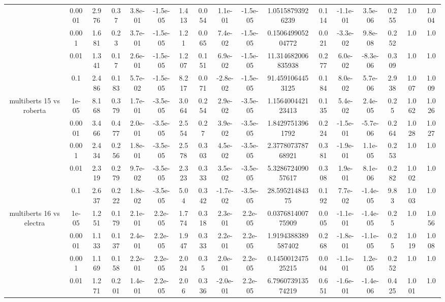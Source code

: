 \begin{tabular}{|c|c|c|c|c|c|c|c|c|c|c|c|c|c|c|c|c|}
 & 0.0001 & 2.976 & 0.37 & 3.8e-01 & -1.5e-05 & 1.413 & 0.054 & 1.1e-01 & -1.5e-05 & 1.05158793926239 & 0.114 & -1.1e-01 & 3.5e-06 & 0.255 & 1.0 & 1.004 \\
 & 0.001 & 1.681 & 0.23 & 3.7e-01 & -1.5e-05 & 1.21 & 0.065 & 7.4e-02 & -1.5e-05 & 0.150649905204772 & 0.021 & -3.3e-02 & 9.8e-08 & 0.252 & 1.0 & 1.0 \\
 & 0.01 & 1.341 & 0.17 & 2.6e-01 & -1.5e-05 & 1.207 & 0.151 & 6.9e-02 & -1.5e-05 & 11.314682006835938 & 0.277 & 6.0e-02 & -8.3e-06 & 0.309 & 1.0 & 1.0 \\
 & 0.1 & 2.486 & 0.183 & 5.7e-02 & -1.5e-05 & 8.217 & 0.071 & -2.8e-02 & -1.5e-05 & 91.4591064453125 & 0.184 & 8.0e-02 & 5.7e-06 & 2.938 & 1.007 & 1.009 \\
\hline
\multirow{5}{*}{multiberts 15 vs roberta } & 1e-05 & 8.168 & 0.379 & 1.7e-01 & -3.5e-05 & 3.064 & 0.254 & 2.9e-02 & -3.5e-05 & 1.156400442123413 & 0.135 & 5.4e-02 & 2.4e-05 & 0.25 & 1.062 & 1.026 \\
 & 0.0001 & 3.466 & 0.477 & 2.0e-01 & -3.5e-05 & 2.554 & 0.27 & 3.9e-02 & -3.5e-05 & 1.84297513961792 & 0.224 & -1.5e-01 & -5.7e-06 & 0.264 & 1.028 & 1.027 \\
 & 0.001 & 2.434 & 0.256 & 1.8e-01 & -3.5e-05 & 2.578 & 0.303 & 4.5e-02 & -3.5e-05 & 2.377807378768921 & 0.381 & -1.9e-01 & 1.1e-05 & 0.253 & 1.0 & 1.0 \\
 & 0.01 & 2.319 & 0.279 & 9.7e-02 & -3.5e-05 & 2.323 & 0.333 & 3.5e-02 & -3.5e-05 & 5.328672409057617 & 0.308 & 1.9e-01 & 8.1e-06 & 0.282 & 1.002 & 1.0 \\
 & 0.1 & 2.637 & 0.222 & 1.8e-02 & -3.5e-05 & 5.04 & 0.342 & -1.7e-02 & -3.5e-05 & 28.59521484375 & 0.192 & 7.7e-02 & -1.4e-05 & 9.83 & 1.003 & 1.0 \\
\hline
\multirow{5}{*}{multiberts 16 vs electra } & 1e-05 & 1.251 & 0.179 & 2.1e-01 & 2.2e-05 & 1.774 & 0.318 & 2.3e-01 & 2.2e-05 & 0.037681400775909 & 0.005 & -1.1e-01 & -1.4e-05 & 0.25 & 1.0 & 1.056 \\
 & 0.0001 & 1.133 & 0.137 & 2.4e-01 & 2.2e-05 & 1.947 & 0.333 & 2.2e-01 & 2.2e-05 & 1.9194388389587402 & 0.268 & -1.8e-01 & -1.1e-05 & 0.25 & 1.019 & 1.008 \\
 & 0.001 & 1.169 & 0.158 & 2.2e-01 & 2.2e-05 & 2.024 & 0.35 & 2.0e-01 & 2.2e-05 & 0.145001247525215 & 0.004 & -1.1e-01 & 1.2e-05 & 0.252 & 1.0 & 1.0 \\
 & 0.01 & 1.271 & 0.201 & 1.4e-01 & 2.2e-05 & 2.06 & 0.336 & -2.0e-01 & 2.2e-05 & 6.796073913574219 & 0.651 & -1.6e-01 & -1.4e-06 & 0.425 & 1.001 & 1.0 \\

\end{tabular}

